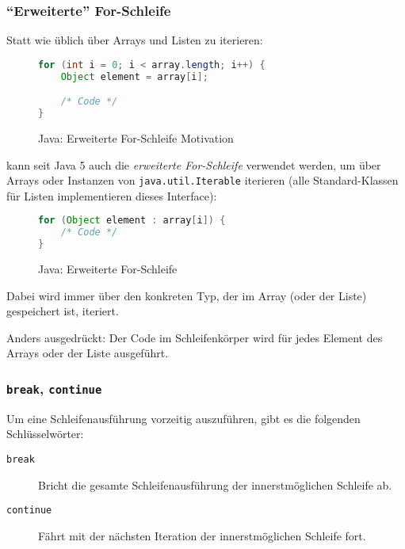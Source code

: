 	\subsubsection{\enquote{Erweiterte} For-Schleife}
		Statt wie üblich über Arrays und Listen zu iterieren:
		\begin{figure}[H]
			\centering
			\begin{lstlisting}[language = Java]
for (int i = 0; i < array.length; i++) {
	Object element = array[i];

	/* Code */
}
			\end{lstlisting}
			\caption{Java: Erweiterte For-Schleife Motivation}
		\end{figure}
		kann seit Java 5 auch die \textit{erweiterte For-Schleife} verwendet werden, um über Arrays oder Instanzen von \texttt{java.util.Iterable} iterieren (alle Standard-Klassen für Listen implementieren dieses Interface):
		\begin{figure}[H]
			\centering
			\begin{lstlisting}[language = Java]
for (Object element : array[i]) {
	/* Code */
}
			\end{lstlisting}
			\caption{Java: Erweiterte For-Schleife}
		\end{figure}
		Dabei wird immer über den konkreten Typ, der im Array (oder der Liste) gespeichert ist, iteriert.
		
		Anders ausgedrückt: Der Code im Schleifenkörper wird für jedes Element des Arrays oder der Liste ausgeführt.
	
	\subsubsection{\texttt{break}, \texttt{continue}}
		Um eine Schleifenausführung vorzeitig auszuführen, gibt es die folgenden Schlüsselwörter:
		\begin{description}
			\item[\texttt{break}] Bricht die gesamte Schleifenausführung der innerstmöglichen Schleife ab.
			\item[\texttt{continue}] Fährt mit der nächsten Iteration der innerstmöglichen Schleife fort.
		\end{description}
		

